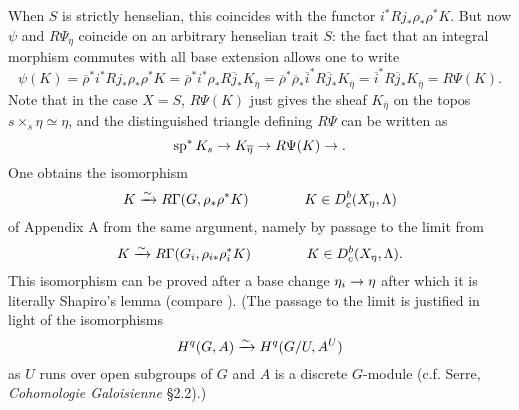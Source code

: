 \documentclass[deligne.tex]{subfiles}
\begin{document}
When $S$ is strictly henselian, this coincides with the functor 
$i^*Rj_*\rho_*\rho^*K$. But now $\psi$ and $R\Psi_\eta$ coincide on
an arbitrary henselian trait $S$:
the fact that an integral morphism commutes with all base
extension \cite[VIII 5.6]{SGAA} allows one to write
\begin{equation*}
	\psi(K)=\overline\rho^*i^*Rj_*\rho_*\rho^*K
	=\overline\rho^*i^*\rho_*R\overline j_*K_{\overline\eta}
	=\overline\rho^*\overline\rho_*\overline i^*R\overline j_*K_{\overline\eta}
	=\overline i^*R\overline j_*K_{\overline\eta}
	=R\Psi(K).
\end{equation*}
Note that in the case $X=S$, $R\Psi(K)$ just gives the sheaf 
$K_{\overline\eta}$ on the topos $s\times_s\eta\simeq\eta$, and the
distinguished triangle defining $R\Psi$ can be written as
\begin{equation*}
	\operatorname{sp}^*K_{s}\rightarrow K_{\overline\eta}\rightarrow R\Psi(K)\rightarrow.
\end{equation*}
One obtains the isomorphism
\begin{equation*}
	K\xrightarrow\sim R\Gamma(G,\rho_*\rho^*K)\qquad\qquad K\in D^b_c(X_\eta,\Lambda)
\end{equation*}
of Appendix A from the same argument, namely by passage to the limit from
\begin{equation*}
	K\xrightarrow\sim R\Gamma(G_i,\rho_{i*}\rho^*_iK)\qquad\qquad K\in D^b_c(X_\eta,\Lambda).
\end{equation*}
This isomorphism can be proved after a base change $\eta_i\rightarrow\eta$
after which it is literally Shapiro's lemma
(compare \cite[XIII \S1]{SGA7}).
(The passage to the limit is justified in light of the isomorphisms
\begin{equation*}
	H^q(G,A)\xrightarrow\sim H^q(G/U,A^U)
\end{equation*}
as $U$ runs over open subgroups of $G$ and $A$ is a discrete $G$-module
(c.f. Serre, \emph{Cohomologie Galoisienne} \S2.2).)
\end{document}
